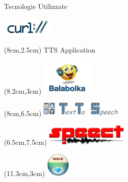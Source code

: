 \documentclass{beamer}
\begin{document}
\begin{frame}{Tecnologie Utilizzate}
\begin{textblock*}{5cm}
			\includegraphics[width=2.5cm]{images/curl_logo}
		\end{textblock*}
		\begin{textblock*}{5cm}(8cm,2.5cm) %
			TTS Application
		\end{textblock*}
		\begin{textblock*}{5cm}(8.2cm,3cm) %
			\includegraphics[width=2.5cm]{images/balabolka}
		\end{textblock*}
		\begin{textblock*}{5cm}(8cm,6.5cm) %
			\includegraphics[width=4cm]{images/marylogo}
		\end{textblock*}
		\begin{textblock*}{5cm}(6.5cm,7.5cm) %
			\includegraphics[width=4cm]{images/speect_logo_full}
		\end{textblock*}
		\begin{textblock*}{5cm}(11.3cm,3cm) %
			\includegraphics[width=1.2cm]{images/NSIS-logo}
		\end{textblock*}
		
\end{frame}
\end{document}
